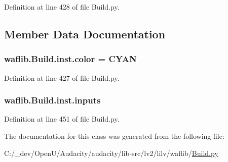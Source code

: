 Definition at line 428 of file Build.\+py.



\subsection{Member Data Documentation}
\subsubsection[{\texorpdfstring{color}{color}}]{ waflib.\+Build.\+inst.\+color = \textquotesingle{}C\+Y\+AN\textquotesingle{}\hspace{0.3cm}{\ttfamily [static]}}\hypertarget{classwaflib_1_1_build_1_1inst_a5623f85428995ae4e1c2274c9e1cdb9c}{}\label{classwaflib_1_1_build_1_1inst_a5623f85428995ae4e1c2274c9e1cdb9c}


Definition at line 427 of file Build.\+py.

\subsubsection[{\texorpdfstring{inputs}{inputs}}]{\setlength{\rightskip}{0pt plus 5cm}waflib.\+Build.\+inst.\+inputs}\hypertarget{classwaflib_1_1_build_1_1inst_a89563182286a4f653e2768d49aefcb40}{}\label{classwaflib_1_1_build_1_1inst_a89563182286a4f653e2768d49aefcb40}


Definition at line 451 of file Build.\+py.



The documentation for this class was generated from the following file\+:\begin{DoxyCompactItemize}
\item 
C\+:/\+\_\+dev/\+Open\+U/\+Audacity/audacity/lib-\/src/lv2/lilv/waflib/\hyperlink{lilv_2waflib_2_build_8py}{Build.\+py}\end{DoxyCompactItemize}
